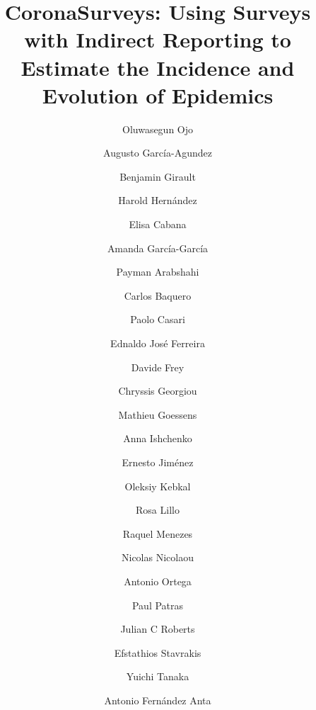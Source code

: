 \documentclass[sigconf]{acmart}
\begin{document}
\title{CoronaSurveys: Using Surveys with Indirect Reporting to Estimate the Incidence and Evolution of Epidemics}

\author{Oluwasegun Ojo}\\
\author{Augusto García-Agundez}\\
\author{Benjamin Girault}\\
\author{Harold Hernández}\\
\author{Elisa Cabana}\\
\author{Amanda García-García}\\
\author{Payman Arabshahi}\\
\author{Carlos Baquero}\\
\author{Paolo Casari}\affiliation{}

\author{Ednaldo José Ferreira}\\
\author{Davide Frey}\\
\author{Chryssis Georgiou}\\
\author{Mathieu Goessens}\\
\author{Anna Ishchenko}\\
\author{Ernesto Jiménez}\\
\author{Oleksiy Kebkal}


\author{Rosa Lillo}\\
\author{Raquel Menezes}\\
\author{Nicolas Nicolaou}\\
\author{Antonio Ortega}\\
\author{Paul Patras}\\
\author{Julian C Roberts}\\
\author{Efstathios Stavrakis}\\
\author{Yuichi Tanaka}\\
\author{Antonio Fernández Anta}\affiliation{}

\renewcommand{\shortauthors}{Ojo et al.}
\end{document}
